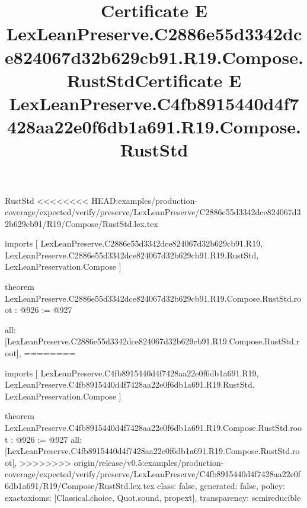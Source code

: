 \begin{lexlean}{RustStd}
<<<<<<<< HEAD:examples/production-coverage/expected/verify/preserve/LexLeanPreserve/C2886e55d3342dce824067d32b629cb91/R19/Compose/RustStd.lex.tex
\title{Certificate E LexLeanPreserve.C2886e55d3342dce824067d32b629cb91.R19.Compose.RustStd}
\begin{coremodule}
imports [
  LexLeanPreserve.C2886e55d3342dce824067d32b629cb91.R19,
  LexLeanPreserve.C2886e55d3342dce824067d32b629cb91.R19.RustStd,
  LexLeanPreservation.Compose
]

theorem LexLeanPreserve.C2886e55d3342dce824067d32b629cb91.R19.Compose.RustStd.root : @926 := @927 {
  all: [LexLeanPreserve.C2886e55d3342dce824067d32b629cb91.R19.Compose.RustStd.root],
========
\title{Certificate E LexLeanPreserve.C4fb8915440d4f7428aa22e0f6db1a691.R19.Compose.RustStd}
\begin{coremodule}
imports [
  LexLeanPreserve.C4fb8915440d4f7428aa22e0f6db1a691.R19,
  LexLeanPreserve.C4fb8915440d4f7428aa22e0f6db1a691.R19.RustStd,
  LexLeanPreservation.Compose
]

theorem LexLeanPreserve.C4fb8915440d4f7428aa22e0f6db1a691.R19.Compose.RustStd.root : @926 := @927 {
  all: [LexLeanPreserve.C4fb8915440d4f7428aa22e0f6db1a691.R19.Compose.RustStd.root],
>>>>>>>> origin/release/v0.5:examples/production-coverage/expected/verify/preserve/LexLeanPreserve/C4fb8915440d4f7428aa22e0f6db1a691/R19/Compose/RustStd.lex.tex
  class: false,
  generated: false,
  policy: exact{axioms: [Classical.choice, Quot.sound, propext]},
  transparency: semireducible
}


\end{coremodule}}
\end{coremodule}
\end{lexlean}
